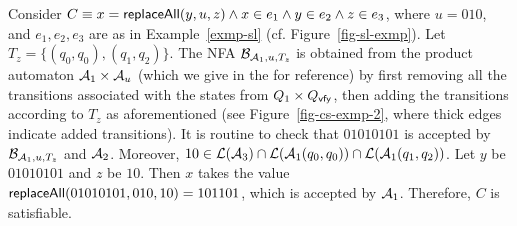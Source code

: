 \begin{example}\label{exmp-cs-case}
Consider $C \equiv x = \mathsf{replaceAll}(y, u, z) \wedge x \in e_1 \wedge y \in e_2 \wedge z \in e_3$, where $u = 010$, and $e_1,e_2,e_3$ are as in Example~\ref{exmp-sl} (cf. Figure~\ref{fig-sl-exmp}). 
Let $T_z = \{(q_0,q_0),(q_1,q_2)\}$. The NFA $\mathcal{B}_{\mathcal{A}_1, u, T_z}$ is obtained
    from the product automaton $\mathcal{A}_1 \times \mathcal{A}_u$ (which we give in the
     for reference) by first removing all the transitions  associated with the states from $Q_1 \times Q_{\mathsf{vfy}}$, then adding the transitions according to $T_z$ as aforementioned (see Figure~\ref{fig-cs-exmp-2}, where thick edges indicate added transitions).  It is routine to check that $01010101$ is accepted by $\mathcal{B}_{\mathcal{A}_1, u, T_z}$ and $\mathcal{A}_2$. Moreover, $10 \in \mathcal{L}(\mathcal{A}_3) \cap \mathcal{L}(\mathcal{A}_1(q_0,q_0)) \cap \mathcal{L}(\mathcal{A}_1(q_1,q_2))$. Let $y$ be $01010101$ and $z$ be $10$. Then $x$ takes the value $\mathsf{replaceAll}(01010101, 010, 10)=101101$, which is accepted by $\mathcal{A}_1$. Therefore, $C$ is satisfiable.
%
\begin{figure}[htbp]
\begin{center}

\end{center}
\end{figure}
\end{example}
